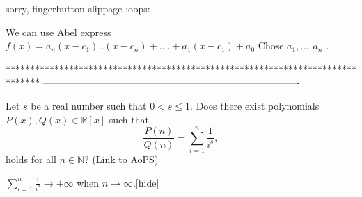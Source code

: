 \begin{solution}
	sorry, finger\/button slippage :oops:
\end{solution}



\begin{solution}
	We can use Abel express
$ f(x)=a_{n}(x-c_{1})..(x-c_{n})+....+a_{1}(x-c_{1})+a_{0}$
Chose $ a_{1},...,a_{n}$ .
\end{solution}
*******************************************************************************
-------------------------------------------------------------------------------

\begin{problem}
	Let $s$ be a real number such that $0 < s \leq 1$. Does there exist polynomials $ P(x),Q(x)\in \mathbb R[x]$ such that
\[\frac{P(n)}{Q(n)}=\sum_{i =1}^{n}\frac{1}{i^{s}},\]
holds for all $n\in \mathbb N$?
	\flushright \href{https://artofproblemsolving.com/community/c6h166797}{(Link to AoPS)}
\end{problem}



\begin{solution}$ \sum_{i=1}^{n}\frac{1}{i^{s}}\to+\infty$ when $ n\to\infty$.[\/hide]
\end{solution}



